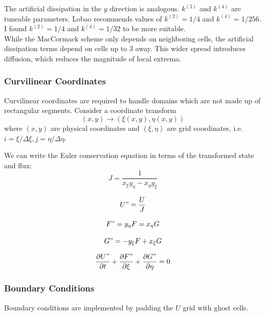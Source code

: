 \documentclass[paper=a4, fontsize=11pt]{scrartcl}
\numberwithin{equation}{section}        %
\numberwithin{figure}{section}          %
\numberwithin{table}{section}               %
\begin{document}
The artificial dissipation in the $y$ direction is analogous. $k^{(2)}$ and $k^{(4)}$ are tuneable parameters. Lobao recommends values of $k^{(2)} = 1/4$ and $k^{(4)} = 1/256$. I found $k^{(2)} = 1/4$ and $k^{(4)} = 1/32$ to be more suitable.\\

While the MacCormack scheme only depends on neighboring cells, the artificial dissipation terms depend on cells up to 3 away. This wider spread introduces diffusion, which reduces the magnitude of local extrema.

\subsubsection{Curvilinear Coordinates}
Curvilinear coordinates are required to handle domains which are not made up of rectangular segments. Consider a coordinate transform
\begin{equation}
    (x, y) \rightarrow (\xi(x,y), \eta(x,y))
\end{equation}
where $(x,y)$ are physical coordinates and $(\xi, \eta)$ are grid coordinates, i.e. $i = \xi / \Delta \xi, j = \eta / \Delta \eta$.

We can write the Euler conservation equation in terms of the transformed state and flux:
\begin{equation}
    J = \frac{1}{x_\xi y_\eta - x_\eta y_\xi}
\end{equation}

\begin{equation}
    U" = \frac{U}{J}
\end{equation}

\begin{equation}
    F" = y_\eta F = x_\eta G
\end{equation}

\begin{equation}
    G" = -y_\xi F + x_\xi G 
\end{equation}

\begin{equation}
    \pdv{U"}{t} + \pdv{F"}{\xi} + \pdv{G"}{\eta} = 0
\end{equation}

\subsubsection{Boundary Conditions}
Boundary conditions are implemented by padding the $U$ grid with ghost cells.\\
\end{document}
